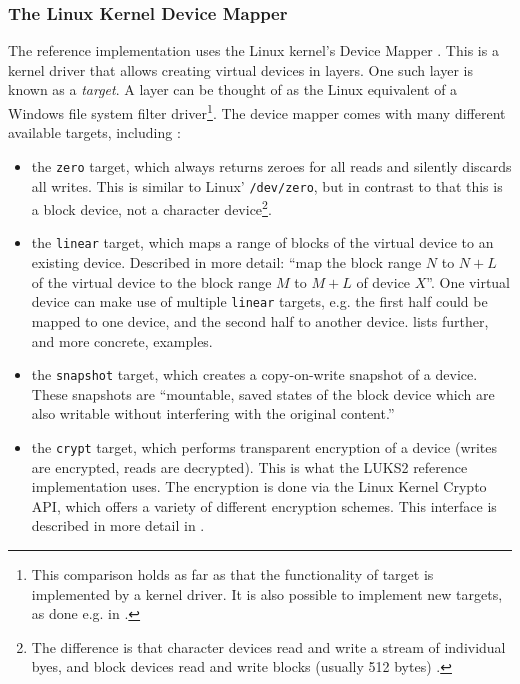 \subsubsection{The Linux Kernel Device Mapper}
\label{chap:otherapproaches.linux.dm}
The reference implementation uses the Linux kernel's Device Mapper \cite{Dmcrypt2020}. This is a kernel driver that allows creating virtual devices in layers. One such layer is known as a \emph{target}. A layer can be thought of as the Linux equivalent of a Windows file system filter driver\footnote{\label{fn:otherapproaches.linux.dmtargetdriver} This comparison holds as far as that the functionality of target is implemented by a kernel driver. It is also possible to implement new targets, as done e.g. in \cite{Barker2019}.}. The device mapper comes with many different available targets, including \cite{Linux}:
\begin{itemize}
	\item the \texttt{zero} target, which always returns zeroes for all reads and silently discards all writes. This is similar to Linux' \texttt{/dev/zero}, but in contrast to that this is a block device, not a character device\footnote{\label{fn:otherapproaches.linux.charvsblock} The difference is that character devices read and write a stream of individual byes, and block devices read and write blocks (usually 512 bytes) \cite{Corbet2005}.}.
	\item the \texttt{linear} target, which maps a range of blocks of the virtual device to an existing device. Described in more detail: ``map the block range $N$ to $N+L$ of the virtual device to the block range $M$ to $M+L$ of device $X$''. One virtual device can make use of multiple \texttt{linear} targets, e.g. the first half could be mapped to one device, and the second half to another device. \cite{Linux} lists further, and more concrete, examples.
	\item the \texttt{snapshot} target, which creates a copy-on-write snapshot of a device. These snapshots are ``mountable, saved states of the block device which are also writable without interfering with the original content.'' \cite{Linux}
	\item the \texttt{crypt} target, which performs transparent encryption of a device (writes are encrypted, reads are decrypted). This is what the LUKS2 reference implementation uses. The encryption is done via the Linux Kernel Crypto API, which offers a variety of different encryption schemes. This interface is described in more detail in \cite{Linux}.
\end{itemize}

